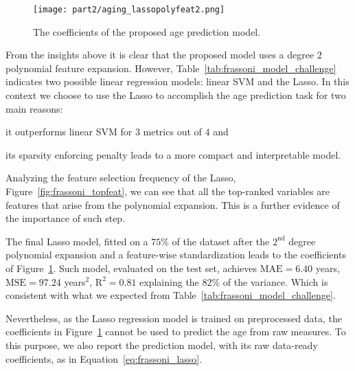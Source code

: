 \begin{figure}[h!]
	\centering
	\texttt{[image: part2/aging\_lassopolyfeat2.png]}
	\caption{The coefficients of the proposed age prediction model.} \label{fig:frassoni_topmodel}
\end{figure}

From the insights above it is clear that the proposed model uses a degree $2$ polynomial feature expansion. However, Table~\ref{tab:frassoni_model_challenge} indicates two possible linear regression models: linear SVM and the Lasso. In this context we choose to use the Lasso to accomplish the age prediction task for two main reasons:
\begin{enumerate*}[label=(\roman*)]
	\item it outperforms linear SVM for $3$ metrics out of $4$ and
	\item its sparsity enforcing penalty leads to a more compact and interpretable model.
\end{enumerate*}

Analyzing the feature selection frequency of the Lasso, Figure~\ref{fig:frassoni_topfeat}, we can see that all the top-ranked variables are features that arise from the polynomial expansion. This is a further evidence of the importance of such step.

The final Lasso model, fitted on a $75\%$ of the dataset after the $2^{\text{nd}}$ degree polynomial expansion and a feature-wise standardization leads to the coefficients of Figure~\ref{fig:frassoni_topmodel}. Such model, evaluated on the test set, achieves $\text{MAE}=6.40$ years, $\text{MSE} = 97.24$ years$^2$, $\text{R}^2 = 0.81$ explaining the $82\%$ of the variance. Which is consistent with what we expected from Table~\ref{tab:frassoni_model_challenge}.

Nevertheless, as the Lasso regression model is trained on preprocessed data, the coefficients in Figure~\ref{fig:frassoni_topmodel} cannot be used to predict the age from raw measures. To this purpose, we also report the prediction model, with its raw data-ready coefficients, as in Equation~\eqref{eq:frassoni_lasso}.

